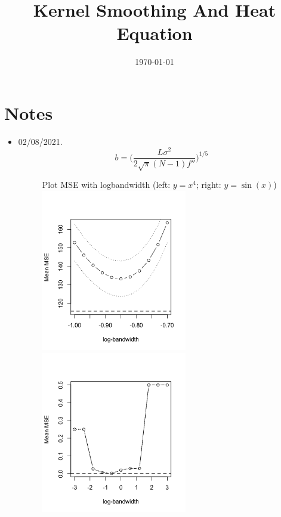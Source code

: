 \documentclass{article}
\title{Kernel Smoothing And Heat Equation}
\date{\today}
\begin{document}
\maketitle

\section{Notes}
\label{sec:notes}

\begin{itemize}







\item 02/08/2021. 
\begin{equation}
         b = \big( \frac{L\sigma^2}{2\sqrt{\pi}(N-1)f''}  \big)^{1/5}
\end{equation}

\begin{figure}[H]
Plot MSE with logbandwidth (left: $y = x^4$; right: $y = \sin(x)$)\\
\includegraphics[width=2.5in]{pic/mse.bw0.png}
\includegraphics[width=2.5in]{pic/mse.bw.png}
\end{figure}


\end{itemize}
\end{document}
